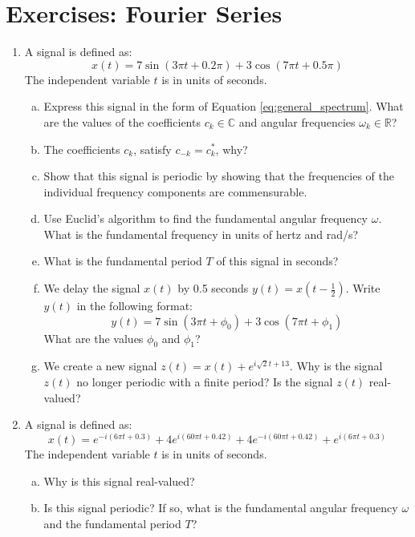 \newpage
\section{Exercises: Fourier Series}

\begin{enumerate}
\item A signal is defined as:
\begin{equation}
    x(t) = 7 \sin(3 \pi t + 0.2\pi) + 3 \cos(7 \pi t + 0.5\pi)  
\end{equation}
The independent variable $t$ is in units of seconds. 
\begin{enumerate}[a)]
    \item Express this signal in the form of Equation \ref{eq:general_spectrum}. What are the values of the coefficients $c_k \in \mathbb{C}$ and angular frequencies $\omega_k \in \mathbb{R}$?
    \item The coefficients $c_{k}$, satisfy $c_{-k}=c_{k}^{*}$, why?
    \item Show that this signal is periodic by showing that the frequencies of the individual frequency components are commensurable.
    \item Use Euclid's algorithm to find the fundamental angular frequency $\omega$. What is the fundamental frequency in units of hertz and rad/s?
    \item What is the fundamental period $T$ of this signal in seconds?
    \item We delay the signal $x(t)$ by 0.5 seconds $y(t) = x(t-\frac{1}{2})$. Write $y(t)$ in the following format:
\begin{equation}
    y(t) = 7 \sin(3\pi t + \phi_0) + 3 \cos(7\pi t + \phi_1)
\end{equation}
What are the values $\phi_0$ and $\phi_1$?
\item We create a new signal $z(t) = x(t) + e^{i \sqrt{2} t + 13}$. Why is the signal $z(t)$ no longer periodic with a finite period? Is the signal $z(t)$ real-valued?
\end{enumerate}

\item A signal is defined as:
  \begin{equation}
    x(t) = e^{-i (6\pi  t + 0.3)}  + 4e^{i (60\pi  t + 0.42)} + 4e^{-i (60\pi t + 0.42)}  + e^{i (6\pi t + 0.3)} 
  \end{equation}
  The independent variable $t$ is in units of seconds. 
  \begin{enumerate}[a)]
  \item Why is this signal real-valued?
    \item Is this signal periodic? If so, what is the fundamental angular frequency $\omega$ and the fundamental period $T$?
   \end{enumerate}



\end{enumerate}

